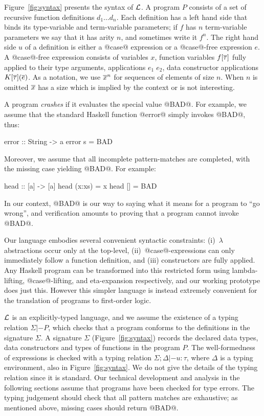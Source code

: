 Figure~\ref{fig:syntax} presents the syntax of $\cal L$.  A program
$P$ consists of a set of recursive function definitions $d_1 \ldots
d_n$. Each definition has a left hand side that binds its type-variable and
term-variable parameters;
if $f$ has $n$ term-variable parameters we say that
it has arity $n$, and sometimes write it $f^n$.
The right hand side $u$ of a definition is either a @case@ expression or a
@case@-free expression $e$.  A @case@-free expression consists of
variables $x$, function variables $f[\overline{\tau}]$ fully applied to their
type arguments, applications $e_1\;e_2$, data constructor applications
$K[\overline{\tau}](\overline{e})$. As a notation, we use
$\overline{x}^{n}$ for sequences of elements of size $n$. When $n$ is
omitted $\overline{x}$ has a size which is implied by the context or is not
interesting.

A program \emph{crashes} if it evaluates the special value @BAD@.
For example, we assume that the standard Haskell function @error@
simply invokes @BAD@, thus:
\begin{code}
  error :: String -> a
  error s = BAD
\end{code}
Moreover, we assume that all incomplete pattern-matches are completed, with the
missing case yielding @BAD@.  For example:
\begin{code}
  head :: [a] -> [a]
  head (x:xs) = x
  head []     = BAD
\end{code}
In our context, @BAD@ is our way to saying what it means for a program to ``go wrong'',
and verification amounts to proving that a program cannot invoke @BAD@.

Our language embodies several convenient syntactic constraints:
(i)~$\lambda$ abstractions occur only at the top-level,
(ii)~@case@-expressions can only immediately follow a function
definition, and (iii) constructors are fully applied.
Any Haskell program can be transformed into this restricted
form using lambda-lifting, @case@-lifting, and eta-expansion respectively,
and our working prototype does just this.
However this simpler language is instead extremely
convenient for the translation of programs to first-order logic.

$\cal L$ is an explicitly-typed language, and we assume the existence
of a typing relation $\Sigma |- P$, which checks that a program
conforms to the definitions in the signature $\Sigma$. A signature
$\Sigma$ (Figure~\ref{fig:syntax}) records the declared data types,
data constructors and types of functions in the program $P$. The
well-formedness of expressions is checked with a typing relation
$\Sigma;\Delta |- u : \tau$, where $\Delta$ is a typing environment,
also in Figure~\ref{fig:syntax}.  We do not give the details of the
typing relation since it is standard.
Our technical development and analysis in the following sections
assume that programs have been checked for type errors.
The typing judgement should check that all pattern matches are
exhaustive; as mentioned above, missing cases should return @BAD@.

